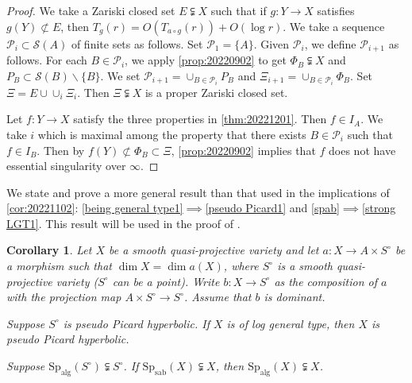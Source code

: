 \documentclass[11pt,english]{smfart}
\theoremstyle{plain}
\newtheorem{cor}[thm]{Corollary}
\theoremstyle{definition}
\theoremstyle{remark}
\numberwithin{equation}{section}
\theoremstyle{plain}
\newcommand{\Spab}{\mathrm{Sp}_{\mathrm{sab}}}
\newcommand{\Spalg}{\mathrm{Sp}_{\mathrm{alg}}}
\begin{document}
	
	\begin{proof}
		We take a Zariski closed set $E\subsetneqq X$ such that if $g:Y\to X$ satisfies $g(Y)\not\subset E$, then $T_{g}(r)=O(T_{a\circ g}(r))+O(\log r)$.
		We take a sequence $\mathcal{P}_i\subset \mathcal{S}(A)$ of finite sets as follows.
		Set $\mathcal{P}_1=\{A\}$.
		Given $\mathcal{P}_i$, we define $\mathcal{P}_{i+1}$ as follows.
		For each $B\in\mathcal{P}_i$, we apply \cref{prop:20220902} to get $\Phi_B\subsetneqq X$ and $P_B\subset \mathcal{S}(B)\backslash\{B\}$.
		We set $\mathcal{P}_{i+1}=\cup_{B\in \mathcal{P}_i}P_B$ and $\Xi_{i+1}=\cup_{B\in\mathcal{P}_i}\Phi_B$.
		Set $\Xi=E\cup \cup_i\Xi_i$.
		Then $\Xi\subsetneqq X$ is a proper Zariski closed set.
		
		Let $f:Y\to X$ satisfy the three properties in \cref{thm:20221201}.
		Then $f\in I_A$.
		We take $i$ which is maximal among the property that there exists $B\in \mathcal{P}_i$ such that $f\in I_B$. 	
		Then by $f(Y)\not\subset \Phi_B\subset \Xi$,
		\cref{prop:20220902} implies that $f$ does not have essential singularity over $\infty$.
	\end{proof}
	We state and prove a more general result than that used in the implications of \cref{cor:20221102}: \ref{being general type1}$\implies$\ref{pseudo Picard1} and \ref{spab}$\implies$\ref{strong LGT1}.
	 This result will be used in the proof of \cite[Theorem C]{CDY22}. 
	\begin{cor}\label{cor:GGL}
		Let $X$ be a smooth quasi-projective variety and let $a:X\to A\times S^{\circ}$ be a morphism such that $\dim X=\dim a(X)$, where $S^{\circ}$ is a smooth quasi-projective variety ($S^{\circ}$ can be a point). Write $b:X\to S^{\circ}$ as the composition of $a$ with the projection map $A\times S^{\circ}\to S^{\circ}$. Assume that $b$ is dominant.
		\begin{thmlist}
			\item\label{coritem1} 
			Suppose $S^{\circ}$ is pseudo Picard hyperbolic.
			If $X$ is of log general type, then $X$  is pseudo Picard hyperbolic.
			\item \label{coritem2} Suppose $\Spalg(S^{\circ})\subsetneqq S^{\circ}$.
			If $\Spab(X)\subsetneqq X$, then $\Spalg(X)\subsetneqq X$.   
		\end{thmlist} 
	\end{cor}
	
\end{document}
